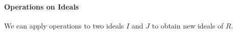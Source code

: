 







\paragraph{Operations on Ideals} We can apply operations to two ideals $I$ and $J$ to obtain new ideals of $R$.

